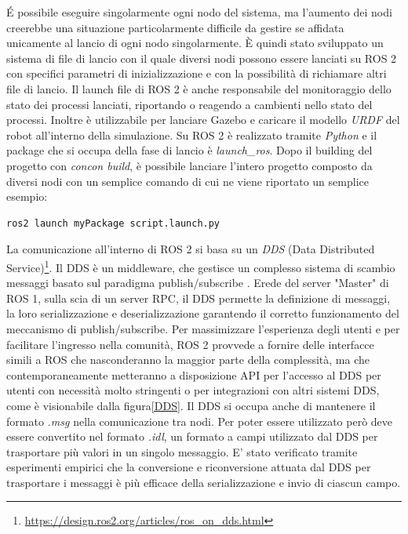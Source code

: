 \documentclass[a4paper,11 pt,oneside]{book}
\theoremstyle{definition}
\begin{document}
\'E possibile eseguire singolarmente ogni nodo del sistema, ma l'aumento dei nodi creerebbe una situazione particolarmente difficile
da gestire se affidata unicamente al lancio di ogni nodo singolarmente. È quindi stato sviluppato un sistema di file di lancio con il quale diversi nodi possono essere lanciati su ROS 2 con specifici parametri di inizializzazione e con la possibilità di richiamare altri file di lancio. Il launch file di ROS 2 è anche responsabile del monitoraggio dello stato dei processi lanciati, riportando o reagendo a cambienti nello stato del processi. Inoltre è utilizzabile per lanciare Gazebo e caricare il modello \emph{URDF} del robot all'interno della simulazione. Su ROS 2 è realizzato tramite \emph{Python} e il package che si occupa della fase di lancio è \emph{launch_ros}.
Dopo il building del progetto con \emph{concon build}, è possibile lanciare l'intero progetto composto da diversi nodi con un semplice comando di cui ne viene riportato un semplice esempio:
\begin{lstlisting}
ros2 launch myPackage script.launch.py
\end{lstlisting}

La comunicazione all'interno di ROS 2 si basa su un \emph{DDS} (Data Distributed Service)\footnote{\url{https://design.ros2.org/articles/ros_on_dds.html}}. Il DDS è un middleware, che gestisce un complesso sistema
di scambio messaggi basato sul paradigma publish/subscribe . Erede del server "Master" di ROS 1, sulla scia di un server RPC, il DDS permette la definizione di messaggi, la loro serializzazione e deserializzazione garantendo
il corretto funzionamento del meccanismo di publish/subscribe. 
Per massimizzare l'esperienza degli utenti e per facilitare l'ingresso nella comunità, ROS 2 provvede a fornire delle interfacce simili a ROS che nasconderanno la maggior parte della complessità, ma che contemporaneamente metteranno a disposizione API per l'accesso al DDS per utenti con necessità molto stringenti o per integrazioni con altri sistemi DDS, come è visionabile dalla figura\ref{DDS}.
Il DDS si occupa anche di mantenere il formato \emph{.msg} nella comunicazione tra nodi. Per poter essere utilizzato però deve essere convertito nel formato \emph{.idl}, un formato a campi utilizzato dal DDS per trasportare più valori in un singolo messaggio. E' stato verificato tramite esperimenti empirici che la conversione e riconversione attuata dal DDS per trasportare i messaggi è più efficace della serializzazione e invio di ciascun campo.
\end{document}
